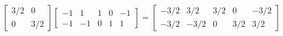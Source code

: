\documentclass{article}
\begin{document}
\thispagestyle{empty}

$$
\begin{bmatrix}3/2&0\\0&3/2\end{bmatrix}
\begin{bmatrix}-1& 1&1&0&-1\\-1&-1&0&1& 1\end{bmatrix}=
\begin{bmatrix}-3/2& 3/2&3/2&0&-3/2\\-3/2&-3/2&0&3/2& 3/2\end{bmatrix}
$$
\end{document}
